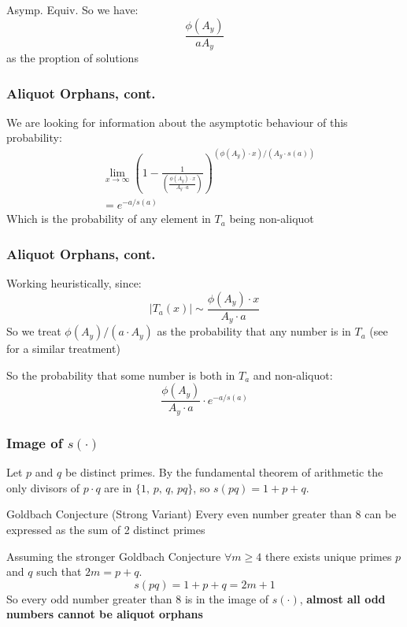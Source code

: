 \documentclass{beamer}
\begin{document}
\begin{frame}{Asymp. Equiv.}
So we have: $$\frac{\phi(A_y)}{aA_y}$$ as the proption of solutions
\end{frame}

\begin{frame}
\frametitle{Aliquot Orphans, cont.}
We are looking for information about the asymptotic behaviour of this probability:
\begin{align*}
    &\lim_{x \to \infty}\left(1-\frac{1}{\left(\frac{\phi(A_y) \cdot x}{ A_y \cdot a}\right)}\right)^{(\phi(A_y) \cdot x)/( A_y \cdot s(a))}\\
    &= e^{-a/s(a)}
\end{align*}
Which is the probability of any element in $T_a$ being non-aliquot
\end{frame}


\begin{frame}
\frametitle{Aliquot Orphans, cont.}
Working heuristically, since:  $$|T_a(x)|  \sim  \frac{\phi(A_y) \cdot x}{ A_y \cdot a}$$ So we treat $\phi(A_y)/ (a \cdot A_y) $ as the probability that any number is in $T_a$ (see \textcolor{blue}{\cite{density}} for a similar treatment)\linebreak

So the probability that some number is both in $T_a$ and non-aliquot:
$$\frac{\phi(A_y)}{ A_y \cdot a} \cdot  e^{-a/s(a)}$$
\end{frame}

\begin{frame}
\frametitle{Image of $s(\cdot)$}
Let $p$ and $q$ be distinct primes. By the fundamental theorem of arithmetic the only divisors of $p \cdot q$ are in $\{1\text{, } p\text{, } q \text{, } pq\}$, so $s(pq) = 1 + p + q$.
\begin{block}{Goldbach Conjecture (Strong Variant)}
Every even number greater than 8 can be expressed as the sum of 2 distinct primes 
\end{block}
Assuming the stronger Goldbach Conjecture $\forall m \geq 4$ there exists unique primes $p$ and $q$ such that $2m = p + q$. $$s(pq) = 1 + p + q = 2m +1 $$
So every odd number greater than 8 is in the image of $s(\cdot)$,  \textbf{almost all odd numbers cannot be aliquot orphans}
\end{frame}
\end{document}
